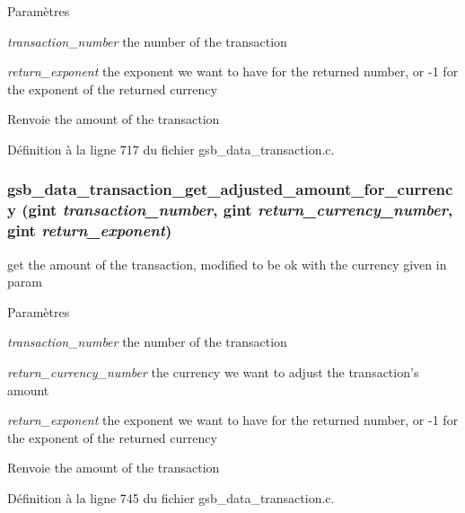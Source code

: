 \begin{DoxyParams}{Paramètres}
\item[{\em transaction\_\-number}]the number of the transaction \item[{\em return\_\-exponent}]the exponent we want to have for the returned number, or -\/1 for the exponent of the returned currency\end{DoxyParams}
\begin{DoxyReturn}{Renvoie}
the amount of the transaction 
\end{DoxyReturn}


Définition à la ligne 717 du fichier gsb\_\-data\_\-transaction.c.

\subsubsection[{gsb\_\-data\_\-transaction\_\-get\_\-adjusted\_\-amount\_\-for\_\-currency}]{ gsb\_\-data\_\-transaction\_\-get\_\-adjusted\_\-amount\_\-for\_\-currency (gint {\em transaction\_\-number}, \/  gint {\em return\_\-currency\_\-number}, \/  gint {\em return\_\-exponent})}\label{gsb__data__transaction_8c_a8f44da078801e109873c479399b72191}
get the amount of the transaction, modified to be ok with the currency given in param


\begin{DoxyParams}{Paramètres}
\item[{\em transaction\_\-number}]the number of the transaction \item[{\em return\_\-currency\_\-number}]the currency we want to adjust the transaction's amount \item[{\em return\_\-exponent}]the exponent we want to have for the returned number, or -\/1 for the exponent of the returned currency\end{DoxyParams}
\begin{DoxyReturn}{Renvoie}
the amount of the transaction 
\end{DoxyReturn}


Définition à la ligne 745 du fichier gsb\_\-data\_\-transaction.c.

